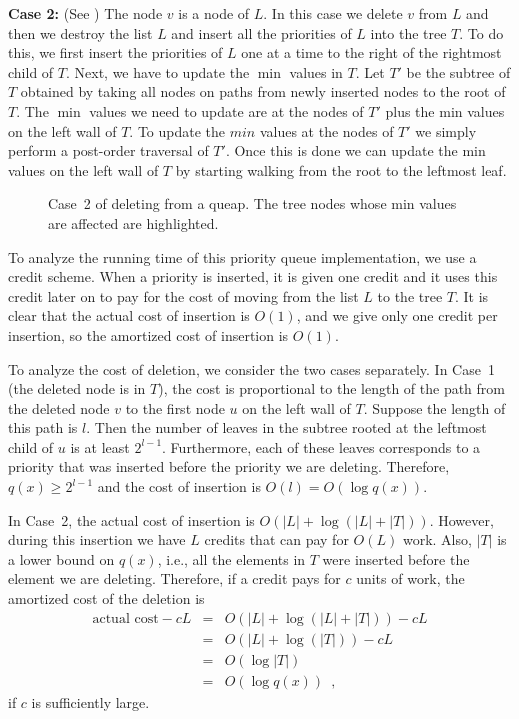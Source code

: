 {\noindent\textbf{Case 2:} (See ) 
The node $v$ is a node of $L$.  In this case we
delete $v$ from $L$ and then we destroy the list $L$ and insert all
the priorities of $L$ into the tree $T$.  To do this, we first insert
the priorities of $L$ one at a time to the right of the rightmost
child of $T$.  Next, we have to update the $\min$ values in $T$.  Let
$T'$ be the subtree of $T$ obtained by taking all nodes on paths from
newly inserted nodes to the root of $T$.  The $\min$ values we need to
update are at the nodes of $T'$ plus the min values on the left wall
of $T$.  To update the $min$ values at the nodes of $T'$ we simply
perform a post-order traversal of $T'$.  Once this is done we can
update the min values on the left wall of $T$ by starting walking from
the root to the leftmost leaf.

\begin{figure}
\caption{Case~2 of deleting from a queap.  The tree nodes whose min values
 are affected are highlighted.}
\end{figure}

To analyze the running time of this priority queue implementation, we
use a credit scheme.  When a priority is inserted, it is given one
credit and it uses this credit later on to pay for the cost of moving
from the list $L$ to the tree $T$.  It is clear that the actual cost
of insertion is $O(1)$, and we give only one credit per insertion, so
the amortized cost of insertion is $O(1)$.  

To analyze the cost of deletion, we consider the two cases separately.
In Case~1 (the deleted node is in $T$), the cost is proportional
to the length of the path from the deleted node $v$ to the first node
$u$ on the left wall of $T$.  Suppose the length of this path is $l$.
Then the number of leaves in the subtree rooted at the leftmost child
of $u$ is at least $2^{l-1}$.  Furthermore, each of these leaves
corresponds to a priority that was inserted before the priority we are
deleting.  Therefore, $q(x)\ge 2^{l-1}$ and the cost of insertion is
$O(l)=O(\log q(x))$.

In Case~2, the actual cost of insertion is $O(|L|+\log(|L|+|T|))$.
However, during this insertion we have $L$ credits that can pay for
$O(L)$ work.  Also, $|T|$ is a lower bound on $q(x)$, i.e., all the
elements in $T$ were inserted before the element we are deleting.  Therefore,
if a credit pays for $c$ units of work, the amortized cost of the deletion is 
\begin{eqnarray*}
   \mbox{actual cost} - cL & = & O(|L|+\log(|L|+|T|)) - cL \\
	& = & O(|L|+\log(|T|)) -cL \\
	& = & O(\log|T|) \\
	& = & O(\log q(x)) \enspace,
\end{eqnarray*}
if $c$ is sufficiently large.

}
